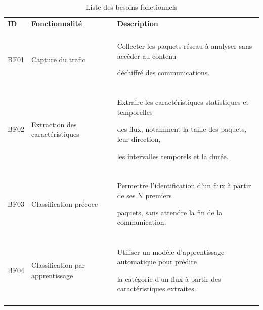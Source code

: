 \begin{table}[H]

\centering

\caption{Liste des besoins fonctionnels}

\label{tab:besoins-fonctionnels}

\small

\begin{tabularx}{\textwidth}{|p{1.4cm}|p{3.2cm}|Y|}

\hline

\textbf{ID} & \textbf{Fonctionnalité} & \textbf{Description} \\\\

\hline



BF01 & Capture du trafic &

Collecter les paquets réseau à analyser sans accéder au contenu

déchiffré des communications. \\\\

\hline



BF02 & Extraction des caractéristiques &

Extraire les caractéristiques statistiques et temporelles

des flux, notamment la taille des paquets, leur direction,

les intervalles temporels et la durée. \\\\

\hline



BF03 & Classification précoce &

Permettre l'identification d'un flux à partir de ses N premiers

paquets, sans attendre la fin de la communication. \\\\

\hline



BF04 & Classification par apprentissage &

Utiliser un modèle d'apprentissage automatique pour prédire

la catégorie d'un flux à partir des caractéristiques extraites. \\\\

\hline




\end{tabularx}
\end{table}
